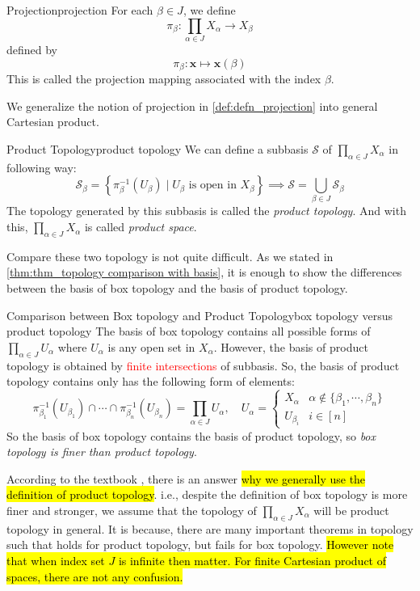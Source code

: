 \documentclass[12pt, a4paper, twoside]{article}
\newcommand{\CS}{{\mathcal {S}}} \newcommand{\CT}{{\mathcal {T}}}
\theoremstyle{plain}
\begin{document}
\newpage 

\begin{defn}{Projection}{projection}
    For each $\beta \in J$, we define 
    \[\pi_\beta: \prod_{\alpha \in J} X_\alpha \rightarrow X_\beta\]
    defined by 
    \[\pi_\beta: \mathbf{x} \mapsto \mathbf{x}(\beta)\]
    This is called the projection mapping associated with the index $\beta$. 
\end{defn}

We generalize the notion of projection in \ref{def:defn_projection} into general Cartesian product. 

\begin{defn}{Product Topology}{product topology}
    We can define a subbasis $\CS$ of $\prod_{\alpha \in J} X_\alpha$ in following way: 
    \[\CS_\beta = \left\{\pi_\beta^{-1}(U_\beta) \mid U_\beta \text{ is open in } X_\beta \right\} \implies \CS = \bigcup_{\beta \in J} \CS_\beta\]
    The topology generated by this subbasis is called the \textit{product topology}. 
    And with this, $\prod_{\alpha \in J} X_\alpha$ is called \textit{product space}. 
\end{defn}

Compare these two topology is not quite difficult. 
As we stated in \ref{thm:thm_topology comparison with basis}, it is enough to show the differences between 
the basis of box topology and the basis of product topology. 

\begin{prop}{Comparison between Box topology and Product Topology}{box topology versus product topology}
    The basis of box topology contains all possible forms of $\prod_{\alpha \in J} U_\alpha$ where $U_\alpha$ is any open set in $X_\alpha$. 
    However, the basis of product topology is obtained by \textcolor{red}{finite intersections} of subbasis. 
    So, the basis of product topology contains only has the following form of elements: 
    \[\pi_{\beta_1}^{-1}(U_{\beta_1}) \cap \cdots \cap \pi_{\beta_n}^{-1}(U_{\beta_n}) = \prod_{\alpha \in J} U_\alpha, \quad U_\alpha = \begin{cases}
        X_\alpha & \alpha \notin \{\beta_1, \cdots, \beta_n\} \\
        U_{\beta_i} & i \in [n]
    \end{cases} \]
    So the basis of box topology contains the basis of product topology, so \textit{box topology is finer than product topology}. 
\end{prop}

According to the textbook \cite{munkres}, there is an answer \hl{why we generally use the definition of product topology}. 
i.e., despite the definition of box topology is more finer and stronger, we assume that the topology of $\prod_{\alpha \in J}X_\alpha$ will be 
product topology in general. It is because, there are many important theorems in topology 
such that holds for product topology, but fails for box topology. 
\hl{However note that when index set $J$ is infinite then matter. For finite Cartesian product of spaces, there are not any confusion.}
\end{document}
